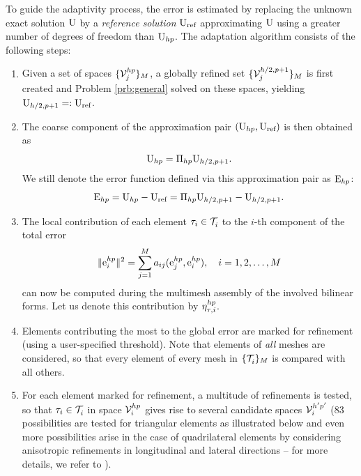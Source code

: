 To guide the adaptivity process, the error is estimated by replacing the unknown exact solution $\U$ by a
\textit{reference solution} $\flfl_{\rf}$ approximating $\U$ using a greater number of degrees of freedom than
$\U_{hp}$. The adaptation algorithm consists of the following steps:

\begin{enumerate}
\item 
Given a set of spaces $\{\Space^{hp}_j\}_{M}$, a globally refined set $\{\Space^{h/2,p+1}_j\}_M$ is first
created and Problem \ref{prb:general} solved on these spaces, yielding $\flfl_{h/2,p+1} =: \flfl_{\rf}$. 

\item
The coarse
component of the approximation pair $(\U_{hp}, \flfl_{\rf})$ is then obtained as
$$
	\U_{hp} = \Projop[hp]\flfl_{h/2,p+1}.
$$
We still denote the error function defined via this approximation pair as $\Ehp$:
$$
	\Ehp = \U_{hp} - \flfl_{\rf} = \Projop[hp]\flfl_{h/2,p+1} - \flfl_{h/2,p+1}.
$$

\item
The local contribution of each element $\elem_i\in\meshgen{i}$ to the $i$-th component of the total error
$$ 
	\norm{\ehp{i}}^2 = \sum_{j=1}^M a_{ij}(\ehp{j}, \ehp{i}),\quad i = 1,2,\ldots, M 
$$ 
can now be computed during the multimesh assembly of the involved bilinear forms. Let us denote this contribution by
$\eta^{hp}_{\elem,i}$.

\item
Elements contributing the
most to the global error are marked for refinement (using a user-specified threshold). Note that elements of
\textit{all} meshes are considered, so that every element of every mesh in $\{\meshgen{i}\}_M$ is compared with all 
others.

\item For each element marked for refinement, a multitude of refinements is
tested, so that $\elem_i\in\meshgen{i}$ in space $\Space^{hp}_i$ gives rise to several candidate spaces
$\Space^{h'p'}_i$ (83 possibilities are tested for triangular elements as illustrated below and even
more possibilities arise in the case of quadrilateral elements by considering anisotropic refinements in longitudinal
and lateral directions -- for more details, we refer to \cite{Hermes-adaptivity,Hermes-hanging-nodes}).


\end{enumerate}
